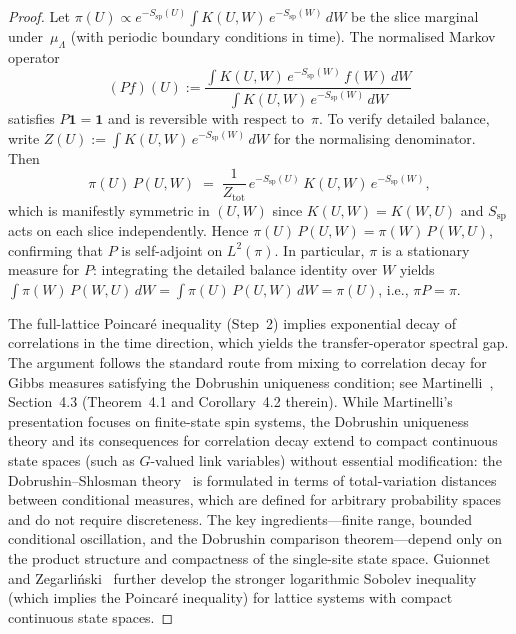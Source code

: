\documentclass[12pt,a4paper]{article}
\theoremstyle{definition}
\theoremstyle{plain}
\theoremstyle{remark}
\begin{document}
\begin{proof}
Let $\pi(U) \propto e^{-S_{\mathrm{sp}}(U)}\int K(U,W)\,e^{-S_{\mathrm{sp}}(W)}\,dW$ be the slice marginal under~$\mu_\Lambda$ (with periodic boundary conditions in time). The normalised Markov operator
\begin{equation}
    (Pf)(U) := \frac{\int K(U,W)\,e^{-S_{\mathrm{sp}}(W)}\,f(W)\,dW}{\int K(U,W)\,e^{-S_{\mathrm{sp}}(W)}\,dW}
\end{equation}
satisfies $P\mathbf{1} = \mathbf{1}$ and is reversible with respect to~$\pi$. To verify detailed balance, write $Z(U) := \int K(U,W)\,e^{-S_{\mathrm{sp}}(W)}\,dW$ for the normalising denominator. Then
\[
  \pi(U)\,P(U,W) \;=\; \frac{1}{Z_{\mathrm{tot}}}\,e^{-S_{\mathrm{sp}}(U)}\,K(U,W)\,e^{-S_{\mathrm{sp}}(W)},
\]
which is manifestly symmetric in $(U,W)$ since $K(U,W) = K(W,U)$ and $S_{\mathrm{sp}}$ acts on each slice independently. Hence $\pi(U)\,P(U,W) = \pi(W)\,P(W,U)$, confirming that $P$ is self-adjoint on $L^2(\pi)$. In particular, $\pi$ is a stationary measure for $P$: integrating the detailed balance identity over $W$ yields $\int \pi(W)\,P(W,U)\,dW = \int \pi(U)\,P(U,W)\,dW = \pi(U)$, i.e., $\pi P = \pi$.

The full-lattice Poincar\'e inequality (Step~2) implies exponential decay of correlations in the time direction, which yields the transfer-operator spectral gap. The argument follows the standard route from mixing to correlation decay for Gibbs measures satisfying the Dobrushin uniqueness condition; see Martinelli~\cite{Martinelli1999}, Section~4.3 (Theorem~4.1 and Corollary~4.2 therein). While Martinelli's presentation focuses on finite-state spin systems, the Dobrushin uniqueness theory and its consequences for correlation decay extend to compact continuous state spaces (such as $G$-valued link variables) without essential modification: the Dobrushin--Shlosman theory~\cite{DobrushinShlosman1985} is formulated in terms of total-variation distances between conditional measures, which are defined for arbitrary probability spaces and do not require discreteness. The key ingredients---finite range, bounded conditional oscillation, and the Dobrushin comparison theorem---depend only on the product structure and compactness of the single-site state space. Guionnet and Zegar\-li\'nski~\cite{GuionnetZegarlinski2003} further develop the stronger logarithmic Sobolev inequality (which implies the Poincar\'e inequality) for lattice systems with compact continuous state spaces.


\end{proof}
\end{document}
